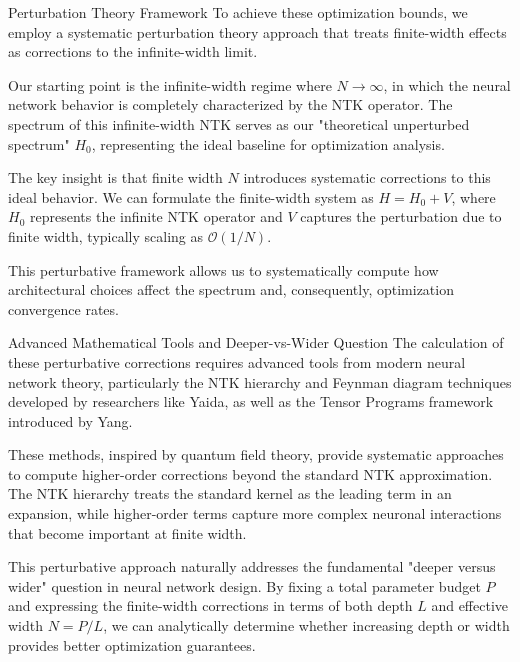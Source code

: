 \documentclass{beamer}
\begin{document}
\begin{frame}{Perturbation Theory Framework}
To achieve these optimization bounds, we employ a systematic perturbation theory approach that treats finite-width effects as corrections to the infinite-width limit.

Our starting point is the infinite-width regime where $N \to \infty$, in which the neural network behavior is completely characterized by the NTK operator. The spectrum of this infinite-width NTK serves as our "theoretical unperturbed spectrum" $H_0$, representing the ideal baseline for optimization analysis.

The key insight is that finite width $N$ introduces systematic corrections to this ideal behavior. We can formulate the finite-width system as $H = H_0 + V$, where $H_0$ represents the infinite NTK operator and $V$ captures the perturbation due to finite width, typically scaling as $\mathcal{O}(1/N)$.

This perturbative framework allows us to systematically compute how architectural choices affect the spectrum and, consequently, optimization convergence rates.
\end{frame}

\begin{frame}{Advanced Mathematical Tools and Deeper-vs-Wider Question}
The calculation of these perturbative corrections requires advanced tools from modern neural network theory, particularly the NTK hierarchy and Feynman diagram techniques developed by researchers like Yaida, as well as the Tensor Programs framework introduced by Yang.

These methods, inspired by quantum field theory, provide systematic approaches to compute higher-order corrections beyond the standard NTK approximation. The NTK hierarchy treats the standard kernel as the leading term in an expansion, while higher-order terms capture more complex neuronal interactions that become important at finite width.

This perturbative approach naturally addresses the fundamental "deeper versus wider" question in neural network design. By fixing a total parameter budget $P$ and expressing the finite-width corrections in terms of both depth $L$ and effective width $N = P/L$, we can analytically determine whether increasing depth or width provides better optimization guarantees.
\end{frame}
\end{document}
